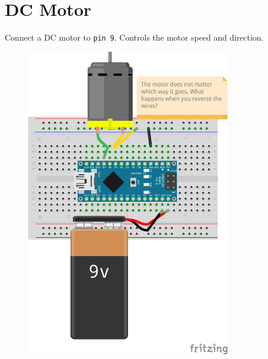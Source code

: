 \documentclass{article}
\begin{document}
\section*{DC Motor}
\begin{minipage}{\textwidth}
Connect a DC motor to \texttt{pin 9}. Controls the motor speed and direction.
\end{minipage}
\begin{figure}[h!]
\centering
\includegraphics[width=0.8\textwidth]{motor_nano_bb.png}
\end{figure}
\newpage
\end{document}
